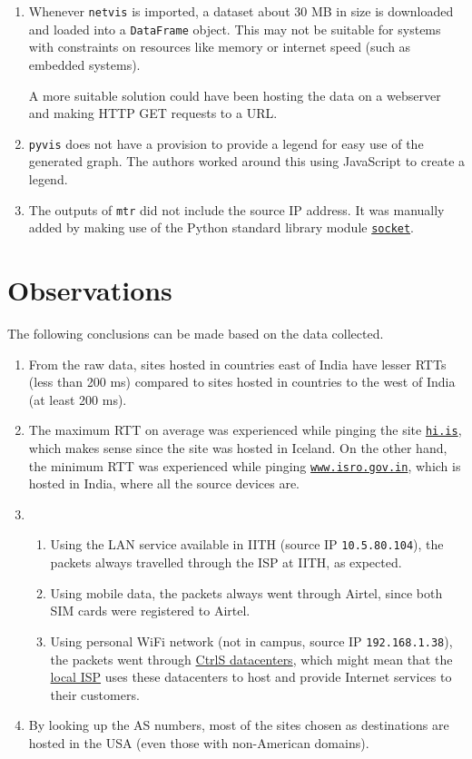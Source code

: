 \documentclass[journal,12pt,twocolumn]{IEEEtran}
\begin{document}
\begin{enumerate}
     \item Whenever \texttt{netvis} is imported, a dataset about 30 MB in size
     is downloaded and loaded into a \texttt{DataFrame} object. This may not be
     suitable for systems with constraints on resources like memory or internet
     speed (such as embedded systems).

     A more suitable solution could have been hosting the data on a webserver
     and making HTTP GET requests to a URL.
     \item \texttt{pyvis} does not have a provision to provide a legend for easy
     use of the generated graph. The authors worked around this using JavaScript
     to create a legend.
     \item The outputs of \texttt{mtr} did not include the source IP address. It
     was manually added by making use of the Python standard library module
     \href{https://docs.python.org/3/library/socket.html}{\texttt{socket}}.
\end{enumerate}

\section{Observations}
The following conclusions can be made based on the data collected.

\begin{enumerate}
     \item From the raw data, sites hosted in countries east of India have
     lesser RTTs (less than 200 ms) compared to sites hosted in countries to the
     west of India (at least 200 ms).
     \item The maximum RTT on average was experienced while pinging the site
     \href{https://www.hi.is/}{\texttt{hi.is}}, which makes sense since the site
     was hosted in Iceland. On the other hand, the minimum RTT was experienced
     while pinging \href{https://www.isro.gov.in/}{\texttt{www.isro.gov.in}},
     which is hosted in India, where all the source devices are.
     \item 
     \begin{enumerate}
          \item Using the LAN service available in IITH (source IP
          \texttt{10.5.80.104}), the packets always travelled through the ISP at
          IITH, as expected. 
          \item Using mobile data, the packets always went through Airtel, since
          both SIM cards were registered to Airtel. 
          \item Using personal WiFi network (not in campus, source IP
          \texttt{192.168.1.38}), the packets went through
          \href{https://www.ctrls.in/}{CtrlS datacenters}, which might mean that
          the \href{https://reachtele.net/}{local ISP} uses these datacenters to
          host and provide Internet services to their customers.
     \end{enumerate}
     \item By looking up the AS numbers, most of the sites chosen as
     destinations are hosted in the USA (even those with non-American domains).
\end{enumerate}
\end{document}
